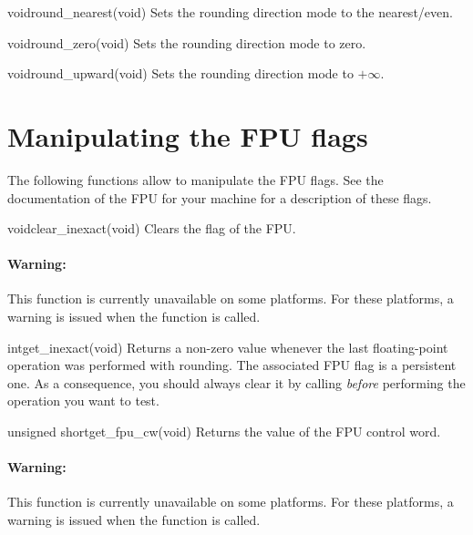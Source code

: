 \documentclass{manual}
\begin{document}
\begin{deffun}{void}{round\_nearest}{(void)}
  Sets the rounding direction mode to the nearest/even.
\end{deffun}

\begin{deffun}{void}{round\_zero}{(void)}
  Sets the rounding direction mode to zero.
\end{deffun}

\begin{deffun}{void}{round\_upward}{(void)}
  Sets the rounding direction mode to $+\infty$.
\end{deffun}

\section{Manipulating the FPU flags}

The following functions allow to manipulate the FPU flags. See the documentation
of the FPU for your machine for a description of these flags.

\begin{deffun}{void}{clear\_inexact}{(void)}
  Clears the  flag of the FPU.

\paragraph{Warning:} This function is currently unavailable on some platforms.
For these platforms, a warning is issued when the function is called.
\end{deffun}


\begin{deffun}{int}{get\_inexact}{(void)}
Returns a non-zero value whenever the last floating-point operation was performed
with rounding. The associated FPU flag is a persistent one. As a consequence,
you should always clear it by calling 
\emph{before} performing the operation you want to test.
\end{deffun}

\begin{deffun}{unsigned short}{get\_fpu\_cw}{(void)}
  Returns the value of the FPU control word.

\paragraph{Warning:} This function is currently unavailable on some platforms.
For these platforms, a warning is issued when the function is called.
\end{deffun}
\end{document}
